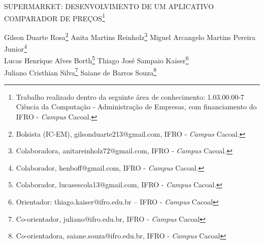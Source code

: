 \documentclass[article,12pt,onesidea,4paper,english,brazil]{abntex2}
\begin{document}
	
	
	\frenchspacing 
	
	\begin{center}
		\LARGE SUPERMARKET: DESENVOLVIMENTO DE UM APLICATIVO COMPARADOR DE PREÇOS\footnote{Trabalho realizado dentro da seguinte área de conhecimento: 1.03.00.00-7 Ciência da Computação - Administração de Empresas, com financiamento do IFRO - \textit{Campus} Cacoal.}
		
		\normalsize
		Gilson Duarte Rosa\footnote{Bolsista (IC-EM), gilsonduarte213@gmail.com, IFRO - \textit{Campus} Cacoal.} 
		Anita Martins Reinholz\footnote{Colaboradora, anitareinholz72@gmail.com, IFRO - \textit{Campus} Cacoal.} 
		Miguel Arcangelo Martins Pereira Junior\footnote{Colaborador, henboff@gmail.com, IFRO - \textit{Campus} Cacoal.} \\
		Lucas Henrique Alves Borth\footnote{Colaborador, lucasescola13@gmail.com, IFRO - \textit{Campus} Cacoal.}
		Thiago José Sampaio Kaiser\footnote{Orientador: thiago.kaiser@ifro.edu.br – IFRO - \textit{Campus} Cacoal}\\
		Juliano Cristhian Silva\footnote{Co-orientador, juliano@ifro.edu.br, IFRO - \textit{Campus} Cacoal}
		Saiane de Barros Souza\footnote{Co-orientadora, saiane.souza@ifro.edu.br, IFRO - \textit{Campus} Cacoal} 
	\end{center}
	
\end{document}
